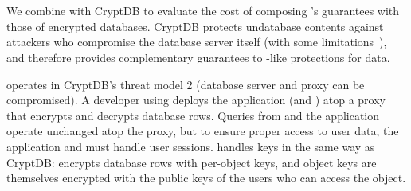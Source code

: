 \section{\syscrypt}
\label{s:eval-cryptdb}

We combine \sys with CryptDB to evaluate the cost of composing \sys's guarantees
with those of encrypted databases.
%
%
CryptDB protects un\xxed database contents against attackers who compromise
the database server itself (with some limitations~\cite{grubbs}), and therefore
provides complementary guarantees to \sys-like protections for \xxed data.
%
%

%
\syscrypt operates in CryptDB's threat model 2 (database server and proxy can be
compromised).
%
A developer using \syscrypt deploys the application (and \sys) atop a proxy that
encrypts and decrypts database rows.
%
%
%
%
%
%
Queries from \sys and the application operate unchanged atop the proxy, but to
ensure proper access to user data, the application and \sys must handle user
sessions.
%
\syscrypt handles keys in the same way as CryptDB: \syscrypt encrypts database rows
with per-object keys, and object keys are themselves encrypted with the public keys
of the users who can access the object.
%

